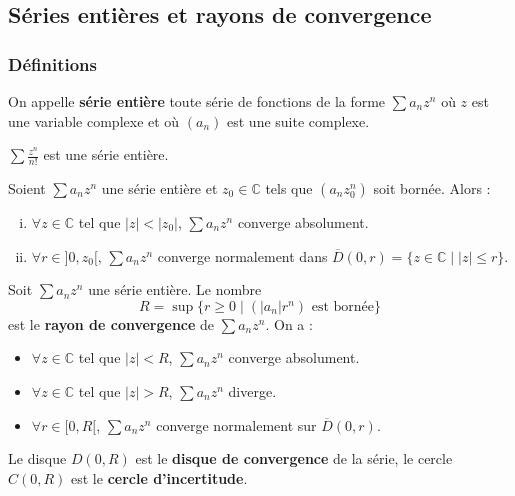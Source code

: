 


	
	\subsection{Séries entières et rayons de convergence}
	
	\subsubsection{Définitions}
	
	
	\begin{definition}
		On appelle \textbf{série entière} toute série de fonctions de la forme $\sum a_n z^n$ où $z$ est une variable complexe et où $(a_n)$ est une suite complexe.
	\end{definition}
	
	\begin{example}
		$\sum \frac{z^n}{n!}$ est une série entière.
	\end{example}
	
	\begin{lemma}[Abel]
		Soient $\sum a_n z^n$ une série entière et $z_0 \in \mathbb{C}$ tels que $(a_n z_0^n)$ soit bornée. Alors :
		\begin{enumerate}[(i)]
			\item $\forall z \in \mathbb{C}$ tel que $|z| < |z_0|$, $\sum a_n z^n$ converge absolument.
			\item $\forall r \in ]0,z_0[, \, \sum a_n z^n$ converge normalement dans $\overline{D}(0, r) = \{ z \in \mathbb{C} \mid |z| \leq r \}$.
		\end{enumerate}
	\end{lemma}
	
	\begin{definition}
		Soit $\sum a_n z^n$ une série entière. Le nombre
		\[ R = \sup \{ r \geq 0 \mid (|a_n|r^n) \text{ est bornée} \} \]
		est le \textbf{rayon de convergence} de $\sum a_n z^n$. On a :
		\begin{itemize}
			\item $\forall z \in \mathbb{C}$ tel que $|z| < R$, $\sum a_n z^n$ converge absolument.
			\item $\forall z \in \mathbb{C}$ tel que $|z| > R$, $\sum a_n z^n$ diverge.
			\item $\forall r \in [0,R[$, $\sum a_n z^n$ converge normalement sur $\overline{D}(0,r)$.
		\end{itemize}
		Le disque $D(0,R)$ est le \textbf{disque de convergence} de la série, le cercle $C(0,R)$ est le \textbf{cercle d'incertitude}.
	\end{definition}
	
